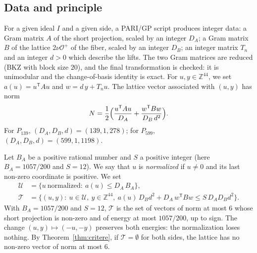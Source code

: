 \documentclass[11pt,a4paper]{amsart}
\theoremstyle{plain}
\theoremstyle{definition}
\numberwithin{equation}{section}
\newcommand{\Z}{\mathbb{Z}}
\newcommand{\Op}{\mathcal{O}^{+}}
\newcommand{\Uc}{\mathcal{U}}
\newcommand{\Tc}{\mathcal{T}}
\begin{document}
\subsection{Data and principle}
For a given ideal $I$ and a given side, a PARI/GP script produces integer data: a Gram matrix $A$ of the short projection, scaled by an integer $D_A$; a Gram matrix $B$ of the lattice $2\nu\Op$ of the fiber, scaled by an integer $D_B$; an integer matrix $T_n$ and an integer $d>0$ which describe the lifts. The two Gram matrices are reduced (BKZ with block size $20$), and the final transformation is checked: it is unimodular and the change-of-basis identity is exact. For $u,y\in\Z^{44}$, we set $a(u)=u^{\mathsf T}Au$ and $w=d\,y+T_nu$. The lattice vector associated with $(u,y)$ has norm
\begin{equation}\label{eq:normeuy}
N=\frac12\Bigl(\frac{u^{\mathsf T}Au}{D_A}+\frac{w^{\mathsf T}Bw}{D_B\,d^2}\Bigr).
\end{equation}
For $P_{139}$, $(D_A,D_B,d)=(139,1,278)$; for $P_{599}$, $(D_A,D_B,d)=(599,1,1198)$.

Let $B_A$ be a positive rational number and $S$ a positive integer (here $B_A=1057/200$ and $S=12$). We say that $u$ is \emph{normalized} if $u\ne0$ and its last non-zero coordinate is positive. We set
\begin{align*}
\Uc&=\{u\ \text{normalized}:\ a(u)\le D_A\,B_A\},\\
\Tc&=\{(u,y):\ u\in\Uc,\ y\in\Z^{44},\ a(u)\,D_Bd^2+D_A\,w^{\mathsf T}Bw\le S\,D_AD_Bd^2\}.
\end{align*}
With $B_A=1057/200$ and $S=12$, $\Tc$ is the set of vectors of norm at most $6$ whose short projection is non-zero and of energy at most $1057/200$, up to sign. The change $(u,y)\mapsto(-u,-y)$ preserves both energies: the normalization loses nothing. By Theorem~\ref{thm:critere}, if $\Tc=\emptyset$ for both sides, the lattice has no non-zero vector of norm at most $6$.
\end{document}

